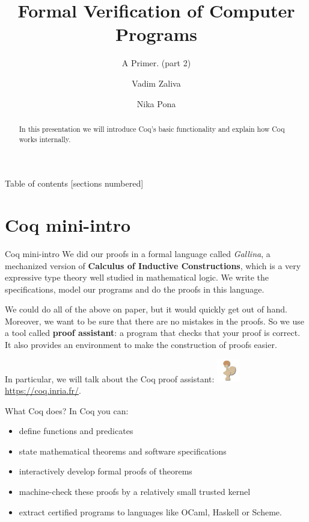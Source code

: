 \documentclass[10pt]{beamer}
\title{Formal Verification of Computer Programs}
\subtitle{A Primer. (part 2)}
\date{\date{}}
\author[shortname]{Vadim Zaliva \inst{1} \and Nika Pona \inst{2}}
\institute[shortinst]{\inst{1}Carnegie Mellon University \and \inst{2} Digamma.ai}
\begin{document}
\maketitle
\begin{frame}
\begin{abstract}

In this presentation we will introduce Coq's basic functionality and explain how Coq works internally.

\end{abstract}

\end{frame}

\begin{frame}{Table of contents}
  [sections numbered]
  \tableofcontents[hideallsubsections]
\end{frame}



\section{Coq mini-intro}

\begin{frame}{Coq mini-intro}
  We did our proofs in a formal language called {\it Gallina}, a mechanized version of {\bf Calculus of Inductive Constructions}, which is a very expressive type theory well studied in mathematical logic. We write the specifications, model our programs and do the proofs in this language.

  \smallskip
We could do all of the above on paper, but it would quickly get out of hand. Moreover, we want to be sure that there are no mistakes in the proofs. So we use a tool called {\bf proof assistant}: a program that checks that your proof is correct. It also provides an environment to make the construction of proofs easier. 

In particular, we will talk about the Coq proof assistant: \includegraphics[width=1cm]{coq.png} \url{https://coq.inria.fr/}.

\end{frame}

\begin{frame}{What Coq does?}
  In Coq you can:
  \begin{itemize}
  
    \item define functions and predicates
    \item state mathematical theorems and software specifications
    \item interactively develop formal proofs of theorems
    \item machine-check these proofs by a relatively small trusted kernel
    \item extract certified programs to languages like OCaml, Haskell or Scheme.
  \end{itemize}
  
\end{frame}
\end{document}
